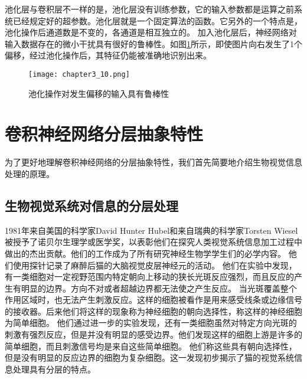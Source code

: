 池化层与卷积层不一样的是，池化层没有训练参数，它的输入参数都是运算之前系统已经规定好的超参数。池化层就是一个固定算法的函数。它另外的一个特点是，池化操作后通道数是不变的，各通道是相互独立的。
加入池化层后，神经网络对输入数据存在的微小干扰具有很好的鲁棒性。如图\ref{fig:chapter3_10}所示，即使图片向右发生了1个偏移，经过池化操作后，其特征仍能被准确地识别出来。
\begin{figure}
    \centering
    \texttt{[image: chapter3\_10.png]}
    \caption{池化操作对发生偏移的输入具有鲁棒性}
    \label{fig:chapter3_10}
\end{figure}

\section{卷积神经网络分层抽象特性}
为了更好地理解卷积神经网络的分层抽象特性，我们首先简要地介绍生物视觉信息处理的原理。
\subsection{生物视觉系统对信息的分层处理}
1981年来自美国的科学家David Hunter Hubel和来自瑞典的科学家Torsten Wiesel被授予了诺贝尔生理学或医学奖，以表彰他们在探究人类视觉系统信息加工过程中做出的杰出贡献\cite{Hubel1998EarlyEO}。他们的工作成为了所有研究神经生物学学生们的必学内容。
他们使用探针记录了麻醉后猫的大脑视觉皮层神经元的活动\cite{https://doi.org/10.1113/jphysiol.1959.sp006308}。
他们在实验中发现，有一类细胞对一定视野范围内特定朝向上移动的狭长光斑反应强烈，而且反应的产生有明显的边界。方向不对或者超越边界都无法使之产生反应。
当光斑覆盖整个作用区域时，也无法产生刺激反应。这样的细胞被看作是用来感受线条或边缘信号的接收器。后来他们将这样的现象称为神经细胞的朝向选择性，称这样的神经细胞为简单细胞。
他们通过进一步的实验发现，还有一类细胞虽然对特定方向光斑的刺激有强烈反应，但是并没有明显的感受边界。他们发现这样的细胞上游是许多的简单细胞，而且刺激信号均是来自这些简单细胞。
他们称这些具有朝向选择性，但是没有明显的反应边界的细胞为复杂细胞。这一发现初步揭示了猫的视觉系统信息处理具有分层的特点。

